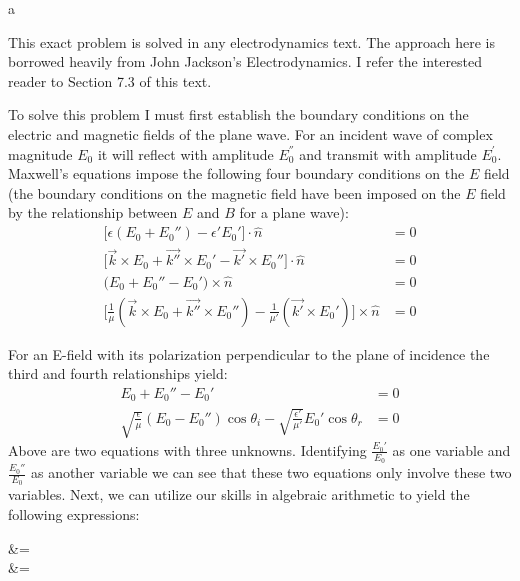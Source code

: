 \begin{homeworkProblem}
\begin{homeworkSection}{a}

This exact problem is solved in any electrodynamics text. The approach here is borrowed heavily from John Jackson's Electrodynamics. I refer the interested reader to Section 7.3 of this text.

To solve this problem I must first establish the boundary conditions on the electric and magnetic fields of the plane wave. For an incident wave of complex magnitude $E_0$ it will reflect with amplitude $E_0^{''}$ and transmit with amplitude $E_0^{'}$. Maxwell's equations impose the following four boundary conditions on the $E$ field (the boundary conditions on the magnetic field have been imposed on the $E$ field by the relationship between $E$ and $B$ for a plane wave):
\begin{align*}
   \big[ \epsilon (E_0 + E_0'')- \epsilon'E_0' \big]  \cdot \hat{n} &= 0 \\
   \big[\vec{k}\times E_0 +\vec{k''}\times E_0'-\vec{k'}\times E_0''\big]\cdot \hat{n} &= 0 \\
   \big(E_0 + E_0'' - E_0'\big)\times \hat{n} &= 0 \\ 
   \big[ \frac{1}{\mu}(\vec{k}\times E_0 + \vec{k''}\times E_0'') - \frac{1}{\mu'}(\vec{k'} \times E_0') \big] \times \hat{n} &= 0
\end{align*}

For an E-field with its polarization perpendicular to the plane of incidence the third and fourth relationships yield:
\begin{align*}
   E_0 + E_0''-E_0' &= 0 \\
   \sqrt{\frac{\epsilon}{\mu}}(E_0 - E_0'')\cos\theta_i - \sqrt{\frac{\epsilon'}{\mu'}}E_0'\cos\theta_r & = 0
\end{align*}
Above are two equations with three unknowns. Identifying $\frac{E_0'}{E_0}$ as one variable and $\frac{E_0''}{E_0}$ as another variable we can see that these two equations only involve these two variables. Next, we can utilize our skills in algebraic arithmetic to yield the following expressions:

  \begin{problemAnswer}{
 &=  \\
   &= }
\end{problemAnswer}


\end{homeworkSection}
\end{homeworkProblem}
